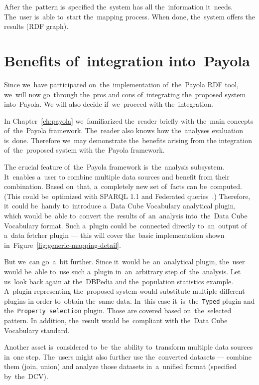 After the~pattern is~specified the~system has all the~information it~needs. The~user is~able to~start the~mapping process. When done, the~system offers
the results (RDF graph).
\FloatBarrier

\section{Benefits of~integration into~Payola}
\label{why-payola}
Since we~have participated on~the~implementation of~the~Payola RDF tool, we~will 
now go~through the~pros and cons of~integrating the~proposed system into~Payola.
We will also decide if~we~proceed with the~integration.

In Chapter~\ref{ch:payola} we~familiarized the~reader briefly with the~main
concepts of~the~Payola framework. The~reader also knows how the~analyses
evaluation is~done. Therefore we~may demonstrate the~benefits arising from
the integration of~the~proposed system with the~Payola framework.

The crucial feature of~the~Payola framework is~the~analysis subsystem. It~enables a~user
to combine multiple data sources and benefit from their 
combination. Based on~that, a~completely new set of~facts can be~computed.
(This could be~optimized with SPARQL 1.1 and Federated queries~\cite{federated-queries}.) 
Therefore, it~could be~handy to~introduce a~Data Cube Vocabulary analytical 
plugin, which would be~able to~convert the~results of~an~analysis into~the~Data 
Cube Vocabulary format. Such a~plugin could be~connected directly to~an~output
of a~data fetcher plugin --- this will cover the~basic implementation shown in~Figure~\ref{fig:generic-mapping-detail}.

But we~can go~a~bit further. Since it~would be~an~analytical plugin, the~user 
would be~able to~use such a~plugin in~an~arbitrary step of~the~analysis. Let us~look back again
at the~DBPedia and the~population statistics example. A~plugin representing the~proposed
system would substitute multiple different plugins 
in order to~obtain the~same data. In~this case it~is~the~\texttt{Typed}
plugin and the~\texttt{Property selection} plugin. Those are covered based on~the~selected pattern.
In addition, the~result would be~compliant with the~Data Cube Vocabulary standard.

Another asset is~considered to~be~the~ability to~transform multiple data 
sources in~one step. The~users might also further use the~converted datasets --- combine them
(join, union) and analyze those datasets in~a~unified format (specified by~the~DCV).


